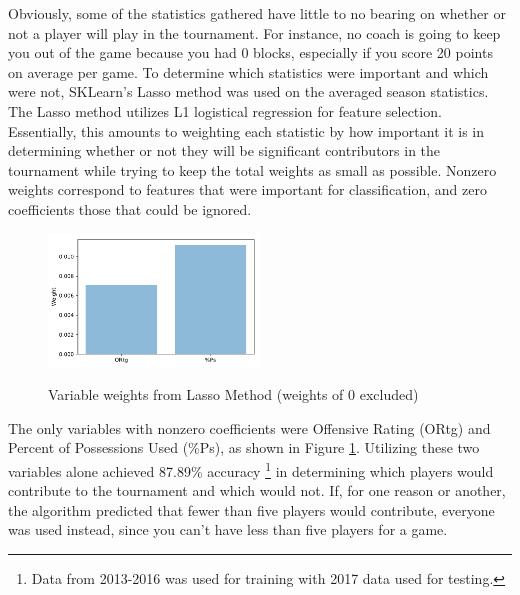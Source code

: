 Obviously, some of the statistics gathered have little to no bearing on whether or not a player will play in the tournament.  
For instance, no coach is going to keep you out of the game because you had 0 blocks, especially if you score 20 points on average per game.  
To determine which statistics were important and which were not, SKLearn's Lasso method was used on the averaged season statistics.  
The Lasso method utilizes L1 logistical regression for feature selection.  
Essentially, this amounts to weighting each statistic by how important it is in determining whether or not they will be significant contributors in the tournament while trying to keep the total weights as small as possible.  
Nonzero weights correspond to features that were important for classification, and zero coefficients those that could be ignored.  
\begin{figure}
\centering
\caption{Variable weights from Lasso Method (weights of 0 excluded)}
\includegraphics[width=0.5\textwidth]{../Feature_Weights.pdf}
\label{fig:weights1}
\end{figure}
The only variables with nonzero coefficients were Offensive Rating (ORtg) and Percent of Possessions Used (\%Ps), as shown in Figure \ref{fig:weights1}.  
Utilizing these two variables alone achieved 87.89\% accuracy \footnote{Data from 2013-2016 was used for training with 2017 data used for testing.} in determining which players would contribute to the tournament and which would not.  
If, for one reason or another, the algorithm predicted that fewer than five players would contribute, everyone was used instead, since you can't have less than five players for a game.  